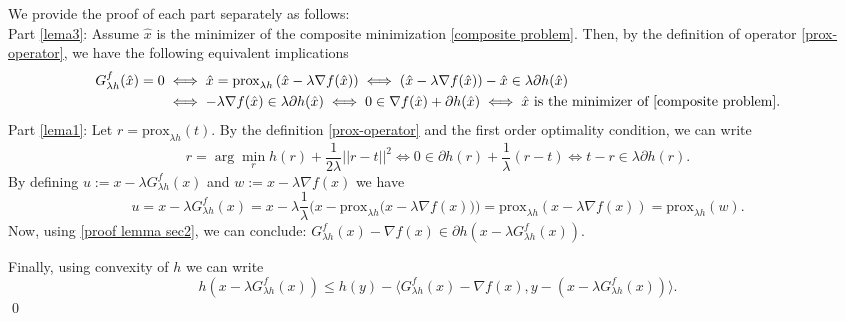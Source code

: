 \documentclass[11pt, a4paper, oneside, reqno]{amsart}
\newenvironment{myproof}[1] {{\it #1.}}{\hfill\qed}
\begin{document}
\begin{myproof}{Proof of Lemma \ref{keylemma}}
We provide the proof of each part separately as follows:\\
Part \ref{lema3}: Assume $\hat{x}$ is the minimizer of the composite minimization \eqref{composite problem}. Then, by the definition of  operator \eqref{prox-operator}, we have the following equivalent implications
\begin{align*}
G^{f}_{\lambda h}(\hat{x}) = 0 & \iff \hat{x} = \text{prox}_{\lambda h}\left(\hat{x} - \lambda \nabla f(\hat{x})\right) \iff (\hat{x} - \lambda \nabla f(\hat{x})) - \hat{x} \in \lambda \partial h(\hat{x}) \\
& \iff - \lambda \nabla f(\hat{x}) \in \lambda \partial h(\hat{x}) \iff 0 \in \nabla f(\hat{x}) + \partial h(\hat{x}) \iff \hat{x} \,\, \text{is the minimizer of \eqref{composite problem}}. 
\end{align*}
Part \ref{lema1}: Let $r = \text{prox}_{\lambda h}(t)$. By the definition \eqref{prox-operator} and the first order optimality condition,  we can write
\begin{equation} \label{proof lemma sec2}
r = \arg \min_{r} h(r) + \dfrac{1}{2\lambda} ||r-t||^2 \iff  0 \in \partial{h(r)}+\dfrac{1}{\lambda}(r-t)\iff t-r \in \lambda \partial{h(r)}   .
\end{equation}
By defining $u := x-\lambda G^{f}_{\lambda h}(x)$ and $w := x-\lambda \nabla f(x)$ we have
\begin{equation*}
u = x-\lambda G^{f}_{\lambda h}(x) = x - \lambda \dfrac{1}{\lambda}\Big(x - \text{prox}_{\lambda h}\big(x - \lambda \nabla f(x)\big)\Big) = \text{prox}_{\lambda h}(x - \lambda \nabla f(x)) =  \text{prox}_{\lambda h}(w).
\end{equation*}
Now, using \eqref{proof lemma sec2}, we can conclude: $G^{f}_{\lambda h}(x) - \nabla f(x) \in \partial{h(x-\lambda G^{f}_{\lambda h}(x))}$.

Finally, using convexity of $h$ we can write
\begin{equation*}
h(x-\lambda G^{f}_{\lambda h}(x)) \leq h(y) - \langle G^{f}_{\lambda h}(x) - \nabla f(x), y - (x - \lambda G^{f}_{\lambda h}(x)) \rangle.  

\end{equation*}
\end{myproof}
\end{document}
